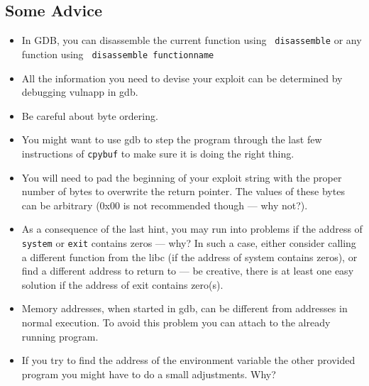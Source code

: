 \documentclass[a4paper,11pt]{article}
\begin{document}
\subsection*{Some Advice}
\begin{itemize}
\item In GDB, you can disassemble the current function using {\tt
      disassemble} or any function using {\tt
      disassemble functionname}
\item All the information you need to devise your exploit can be
  determined by debugging {\sc vulnapp} in gdb.
\item
Be careful about byte ordering.
\item
You might want to use {\sc gdb} to step the program through the last few
instructions of {\tt cpybuf} to make sure it is doing the right thing.
\item
You will need to pad the beginning of your exploit string with the proper number of
bytes to overwrite the return pointer. The values of these bytes can
be arbitrary (0x00 is not recommended though --- why not?).
\item As a consequence of the last hint, you may run into problems if
  the address of {\tt system} or {\tt exit} contains zeros --- why? In
  such a case, either consider calling a different function from the
  libc (if the address of system contains zeros), or find a different
  address to return to --- be creative, there is at least one easy
  solution if the address of exit contains zero(s).
\item Memory addresses, when started in gdb, can be different from addresses in
normal execution.  To avoid this problem you can attach to the already running
program.

\item If you try to find the address of the environment variable the other
provided program you might have to do a small adjustments. Why?


\end{itemize}
\end{document}
